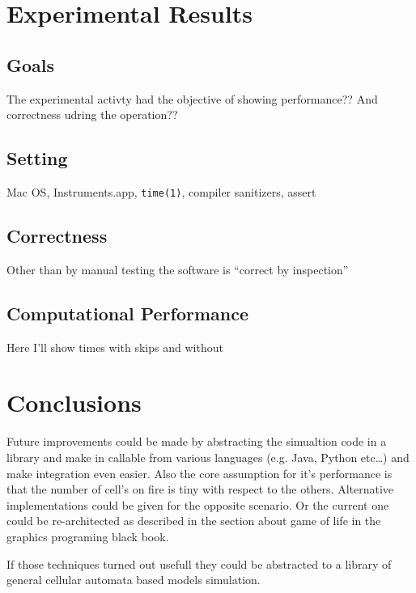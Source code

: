 \documentclass[draft]{article}
\begin{document}
\section{Experimental Results}\label{sec:experimental_results}


\subsection{Goals}\label{sec:goals}

The experimental activty had the objective of showing performance?? And
correctness udring the operation??

\subsection{Setting}\label{sec:setting}

Mac OS, Instruments.app, \texttt{time(1)}, compiler sanitizers, assert

\subsection{Correctness}\label{sec:correctness}

Other than by manual testing the software is ``correct by inspection''

\subsection{Computational Performance}\label{sec:computational_performance}

Here I'll show times with skips and without

\section{Conclusions}\label{sec:conclusions}

Future improvements could be made by abstracting the simualtion code in a
library and make in callable from various languages (e.g. Java, Python etc\dots)
and make integration even easier. Also the core assumption for it's performance
is that the number of cell's on fire is tiny with respect to the others.
Alternative implementations could be given for the opposite scenario. Or the
current one could be re-architected as described in the section about game of
life in the graphics programing black book.

If those techniques turned out usefull they could be abstracted to a library of
general cellular automata based models simulation.



\end{document}
